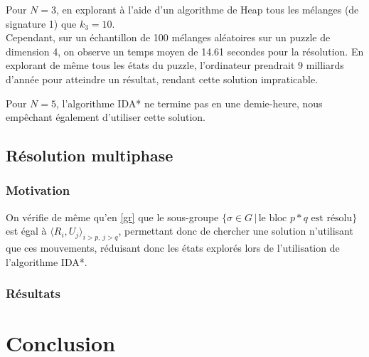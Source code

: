 \documentclass[a4paper, 12pt]{article}
\begin{document}
		Pour $N=3$, en explorant à l'aide d'un algorithme de Heap tous les mélanges (de signature 1) que $k_3=10$. \\
		
		Cependant, sur un échantillon de 100 mélanges aléatoires sur un puzzle de dimension 4, on observe un temps moyen de 14.61 secondes pour la résolution. En explorant de même tous les états du puzzle, l'ordinateur prendrait 9 milliards d'année pour atteindre un résultat, rendant cette solution impraticable.
		
		\begin{center}
		\end{center}
		
		Pour $N=5$, l'algorithme IDA* ne termine pas en une demie-heure, nous empêchant également d'utiliser cette solution.
		
	
	
	\subsection{Résolution multiphase}
	\subsubsection*{Motivation}
	
	On vérifie de même qu'en \ref{gr} que le sous-groupe $\{\sigma \in G\,|\, \text{le bloc $p*q$ est résolu}\}$ est égal à $\langle R_i, U_j\rangle_{i>p,\, j>q}$, permettant donc de chercher une solution n'utilisant que ces mouvements, réduisant donc les états explorés lors de l'utilisation de l'algorithme IDA*.
	\subsubsection*{Résultats}
	
	\section{Conclusion}
\end{document}
